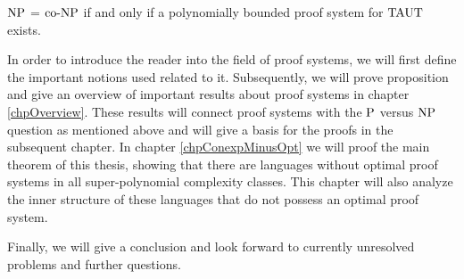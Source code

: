   \begin{proposition} \label{prpNPcoNP}
    \(\NP\) = \(\coNP\) if and only if a polynomially bounded proof system for \(\TAUT\) exists.
  \end{proposition}

  In order to introduce the reader into the field of proof systems, we will first define the important notions used related to it. Subsequently, we will prove proposition \label{prpNPcoNP} and give an overview of important results about proof systems in chapter \ref{chpOverview}. These results will connect proof systems with the \(\P\) versus \(\NP\) question as mentioned above and will give a basis for the proofs in the subsequent chapter.
  In chapter \ref{chpConexpMinusOpt} we will proof the main theorem of this thesis, showing that there are languages without optimal proof systems in all super-polynomial complexity classes. This chapter will also analyze the inner structure of these languages that do not possess an optimal proof system.

  Finally, we will give a conclusion and look forward to currently unresolved problems and further questions.

